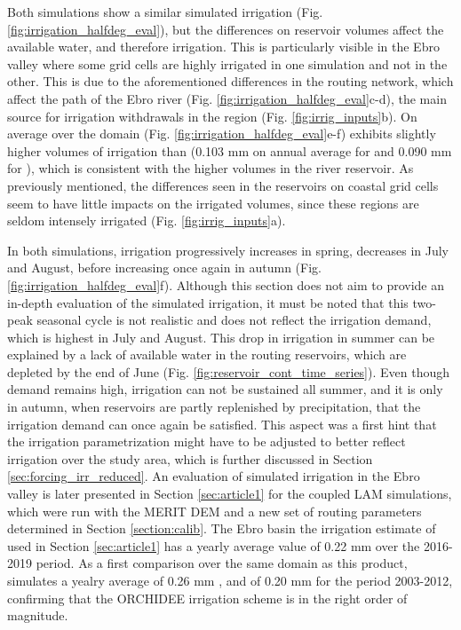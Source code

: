 Both simulations show a similar simulated irrigation (Fig. \ref{fig:irrigation_halfdeg_eval}), but the differences on reservoir volumes affect the available water, and therefore irrigation. This is particularly visible in the Ebro valley where some grid cells are highly irrigated in one simulation and not in the other. This is due to the aforementioned differences in the routing network, which affect the path of the Ebro river (Fig. \ref{fig:irrigation_halfdeg_eval}c-d), the main source for irrigation withdrawals in the region (Fig. \ref{fig:irrig_inputs}b).
On average over the domain (Fig. \ref{fig:irrigation_halfdeg_eval}e-f) \std exhibits slightly higher volumes of irrigation than \native (0.103 mm \perday on annual average for \std and 0.090 mm \perday for \native), which is consistent with the higher volumes in the river reservoir. 
As previously mentioned, the differences seen in the reservoirs on coastal grid cells seem to have little impacts on the irrigated volumes, since these regions are seldom intensely irrigated (Fig. \ref{fig:irrig_inputs}a). 

In both simulations, irrigation progressively increases in spring, decreases in July and August, before increasing once again in autumn (Fig. \ref{fig:irrigation_halfdeg_eval}f). Although this section does not aim to provide an in-depth evaluation of the simulated irrigation, it must be noted that this two-peak seasonal cycle is not realistic and does not reflect the irrigation demand, which is highest in July and August. 
This drop in irrigation in summer can be explained by a lack of available water in the routing reservoirs, which are depleted by the end of June (Fig. \ref{fig:reservoir_cont_time_series}). Even though demand remains high, irrigation can not be sustained all summer, and it is only in autumn, when reservoirs are partly replenished by precipitation, that the irrigation demand can once again be satisfied. This aspect was a first hint that the irrigation parametrization might have to be adjusted to better reflect irrigation over the study area, which is further discussed in Section \ref{sec:forcing_irr_reduced}.
An evaluation of simulated irrigation in the Ebro valley is later presented in Section \ref{sec:article1} for the coupled LAM simulations, which were run with the MERIT DEM and a new set of routing parameters determined in Section \ref{section:calib}. 
The Ebro basin the irrigation estimate of \citet{dari_regional_2023} used in Section \ref{sec:article1} has a yearly average value of 0.22 mm \perday over the 2016-2019 period. As a first comparison over the same domain as this product, \std simulates a yealry average of 0.26 mm \perday, and \native of 0.20 mm \perday for the period 2003-2012, confirming that the ORCHIDEE irrigation scheme is in the right order of magnitude.

